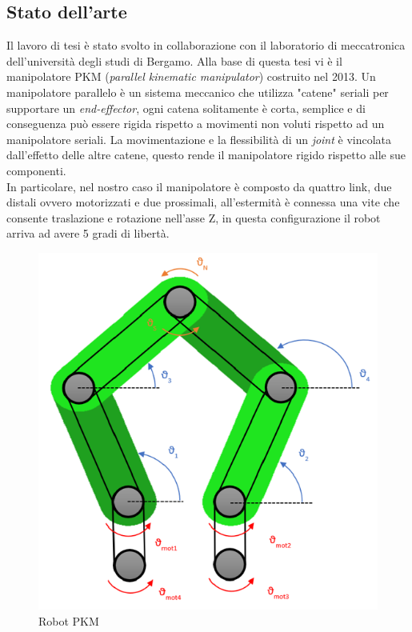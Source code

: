 \subsection{Stato dell'arte}
Il lavoro di tesi è stato svolto in collaborazione con il laboratorio di meccatronica dell'università degli studi di Bergamo. Alla base di questa tesi vi è il manipolatore PKM (\textit{parallel kinematic manipulator}) costruito nel 2013. Un manipolatore parallelo è un sistema meccanico che utilizza "catene" seriali per supportare un \textit{end-effector}, ogni catena solitamente è corta, semplice e di conseguenza può essere rigida rispetto a movimenti non voluti rispetto ad un manipolatore seriali. La movimentazione e la flessibilità di un \textit{joint} è vincolata dall'effetto delle altre catene, questo rende il manipolatore rigido rispetto alle sue componenti. 
\\In particolare, nel nostro caso il manipolatore è composto da quattro link, due distali ovvero motorizzati e due prossimali, all'estermità è connessa una vite che consente traslazione e rotazione nell'asse Z, in questa configurazione il robot arriva ad avere 5 gradi di libertà.
\begin{figure}[ht]
	\begin{center}
		\includegraphics[scale=0.7]{Immagini/Robot1.png}
		\caption{Robot PKM 
		\label{fig:PKM}}
	\end{center}
\end{figure}
